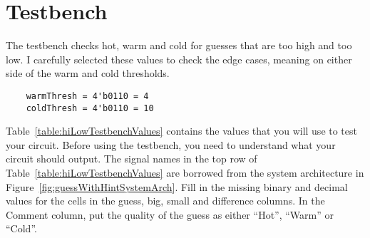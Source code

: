 \section{Testbench}

The testbench checks hot, warm and cold for guesses that
are too high and too low. I carefully selected these values to check the
edge cases, meaning on either side of the warm and cold thresholds.
\begin{verbatim}
    warmThresh = 4'b0110 = 4
    coldThresh = 4'b0110 = 10
\end{verbatim}

Table~\ref{table:hiLowTestbenchValues} contains the values that you will use to test your circuit.
Before using the testbench, you need to understand what your circuit
should output. The signal names in the top row of Table~\ref{table:hiLowTestbenchValues} are borrowed
from the system architecture in Figure~\ref{fig:guessWithHintSystemArch}. Fill in the missing binary and
decimal values for the cells in the guess, big, small and difference
columns. In the Comment column, put the quality of the guess as either
``Hot'', ``Warm'' or ``Cold''.

